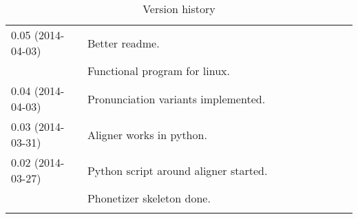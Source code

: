 \begin{longtable}{|p{0.22\linewidth}p{0.8\linewidth}|}
	\hline
	0.05 (2014-04-03) & \tabitem Better readme.\\
		& \tabitem Functional program for linux.\\
	\hline
	0.04 (2014-04-03) & \tabitem Pronunciation variants implemented.\\
	\hline
	0.03 (2014-03-31) & \tabitem Aligner works in python.\\
	\hline
	0.02 (2014-03-27) & \tabitem Python script around aligner started.\\
		& \tabitem Phonetizer skeleton done.\\
	\hline
	\caption{Version history}
\end{longtable}


